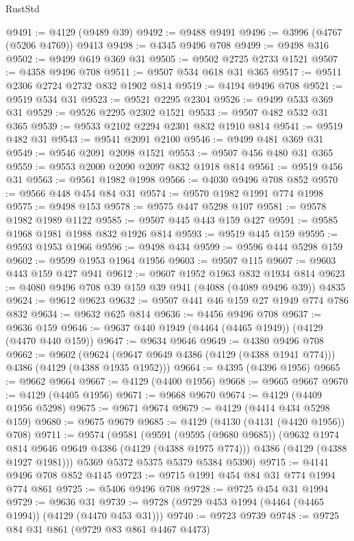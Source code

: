 \begin{lexlean}{RustStd}
\begin{coremodule}
{\begin{coremodule}
{{{{{{{{{{{{{{@9491 := @4129 (@9489 @39)
@9492 := @9488 @9491
@9496 := @3996 (@4767 (@5206 @4769)) @9413
@9498 := @4345 @9496 @708
@9499 := @9498 @316
@9502 := @9499 @619 @369 @31
@9505 := @9502 @2725 @2733 @1521
@9507 := @4358 @9496 @708
@9511 := @9507 @534 @618 @31 @365
@9517 := @9511 @2306 @2724 @2732 @832 @1902 @814
@9519 := @4194 @9496 @708
@9521 := @9519 @534 @31
@9523 := @9521 @2295 @2304
@9526 := @9499 @533 @369 @31
@9529 := @9526 @2295 @2302 @1521
@9533 := @9507 @482 @532 @31 @365
@9539 := @9533 @2102 @2294 @2301 @832 @1910 @814
@9541 := @9519 @482 @31
@9543 := @9541 @2091 @2100
@9546 := @9499 @481 @369 @31
@9549 := @9546 @2091 @2098 @1521
@9553 := @9507 @456 @480 @31 @365
@9559 := @9553 @2000 @2090 @2097 @832 @1918 @814
@9561 := @9519 @456 @31
@9563 := @9561 @1982 @1998
@9566 := @4030 @9496 @708 @852
@9570 := @9566 @448 @454 @84 @31
@9574 := @9570 @1982 @1991 @774 @1998
@9575 := @9498 @153
@9578 := @9575 @447 @5298 @107
@9581 := @9578 @1982 @1989 @1122
@9585 := @9507 @445 @443 @159 @427
@9591 := @9585 @1968 @1981 @1988 @832 @1926 @814
@9593 := @9519 @445 @159
@9595 := @9593 @1953 @1966
@9596 := @9498 @434
@9599 := @9596 @444 @5298 @159
@9602 := @9599 @1953 @1964 @1956
@9603 := @9507 @115
@9607 := @9603 @443 @159 @427 @941
@9612 := @9607 @1952 @1963 @832 @1934 @814
@9623 := @4080 @9496 @708 @39 @159 @39 @941 (@4088 (@4089 @9496 @39)) @4835
@9624 := @9612 @9623
@9632 := @9507 @441 @46 @159 @27 @1949 @774 @786 @832
@9634 := @9632 @625 @814
@9636 := @4456 @9496 @708
@9637 := @9636 @159
@9646 := @9637 @440 @1949 (@4464 (@4465 @1949)) (@4129 (@4470 @440 @159))
@9647 := @9634 @9646
@9649 := @4380 @9496 @708
@9662 := @9602
    (@9624 (@9647 @9649 @4386 (@4129 (@4388 @1941 @774))) @4386 (@4129 (@4388 @1935 @1952)))
@9664 := @4395 (@4396 @1956)
@9665 := @9662 @9664
@9667 := @4129 (@4400 @1956)
@9668 := @9665 @9667
@9670 := @4129 (@4405 @1956)
@9671 := @9668 @9670
@9674 := @4129 (@4409 @1956 @5298)
@9675 := @9671 @9674
@9679 := @4129 (@4414 @434 @5298 @159)
@9680 := @9675 @9679
@9685 := @4129 (@4130 (@4131 (@4420 @1956)) @708)
@9711 := @9574
    (@9581
      (@9591
        (@9595 (@9680 @9685))
        (@9632 @1974 @814 @9646 @9649 @4386 (@4129 (@4388 @1975 @774)))
        @4386
        (@4129 (@4388 @1927 @1981)))
      @5369
      @5372
      @5375
      @5379
      @5384
      @5390)
@9715 := @4141 @9496 @708 @852 @4145
@9723 := @9715 @1991 @454 @84 @31 @774 @1994 @774 @861
@9725 := @5406 @9496 @708
@9728 := @9725 @454 @31 @1994
@9729 := @9636 @31
@9739 := @9728 (@9729 @453 @1994 (@4464 (@4465 @1994)) (@4129 (@4470 @453 @31)))
@9740 := @9723 @9739
@9748 := @9725 @84 @31 @861 (@9729 @83 @861 @4467 @4473)
}}}}}}}}}}}}}}
\end{coremodule}}
\end{coremodule}
\end{lexlean}
